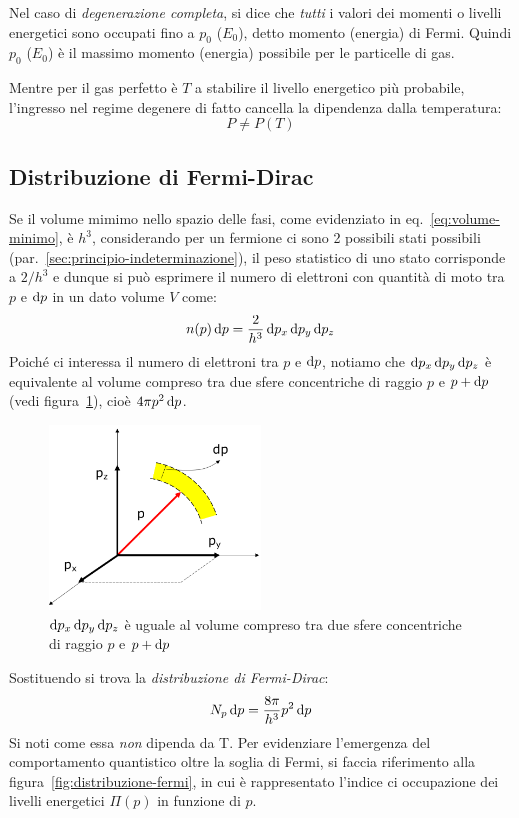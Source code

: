 Nel caso di \emph{degenerazione completa}, si dice che \emph{tutti}
i valori dei momenti o livelli energetici sono occupati fino a $p_0$ ($E_0$), detto momento (energia) di Fermi. Quindi $p_0$ ($E_0$) è il massimo momento (energia) possibile per le particelle di gas. 

Mentre per il gas perfetto è $T$ a stabilire il livello energetico più probabile, l'ingresso nel regime degenere di fatto cancella la dipendenza dalla temperatura:
\[
P \neq P(T)
\]

\subsection{Distribuzione di Fermi-Dirac}
Se il volume mimimo nello spazio delle fasi, come evidenziato in eq.~\eqref{eq:volume-minimo}, è $h^3$, considerando per un fermione ci sono 2 possibili stati possibili (par.~\ref{sec:principio-indeterminazione}), il peso statistico di uno stato corrisponde a $2 / h^3$ e dunque si può esprimere il numero di elettroni con quantità di moto tra $p$ e $\mathop{}\!\mathrm{d} p$ in un dato volume $V$ come:
\[
n(p) \mathop{}\!\mathrm{d} p = \frac{2}{h^3} \mathop{}\!\mathrm{d} p_x \mathop{}\!\mathrm{d} p_y \mathop{}\!\mathrm{d} p_z
\]
Poiché ci interessa il numero di elettroni tra $p$ e $\mathop{}\!\mathrm{d} p$, notiamo che $\mathop{}\!\mathrm{d} p_x \mathop{}\!\mathrm{d} p_y \mathop{}\!\mathrm{d} p_z$ è equivalente al volume compreso tra due sfere concentriche di raggio $p$ e $p + \mathop{}\!\mathrm{d} p$ (vedi figura~\ref{fig:volume-infinitesimo-sfera}), cioè $4 \pi p^2 \mathop{}\!\mathrm{d} p$. 

\begin{figure}
\centering
\includegraphics[width=0.5\textwidth]{immagini/volume-infinitesimo-sfera.png}
\caption{$\mathop{}\!\mathrm{d} p_x \mathop{}\!\mathrm{d} p_y \mathop{}\!\mathrm{d} p_z$ è uguale al volume compreso tra due sfere concentriche di raggio $p$ e $p + \mathop{}\!\mathrm{d} p$}
\label{fig:volume-infinitesimo-sfera}
\end{figure}

Sostituendo si trova la \emph{distribuzione di Fermi-Dirac}:
\begin{equation}\label{eq:fermi-dirac}
    N_p \mathop{}\!\mathrm{d} p = \frac{8 \pi}{h^3} p^2 \mathop{}\!\mathrm{d} p
\end{equation}
Si noti come essa \emph{non} dipenda da T. Per evidenziare l'emergenza del comportamento quantistico oltre la soglia di Fermi, si faccia riferimento alla figura~\ref{fig:distribuzione-fermi}, in cui è rappresentato l'indice ci occupazione dei livelli energetici $\Pi(p)$ in funzione di $p$.

